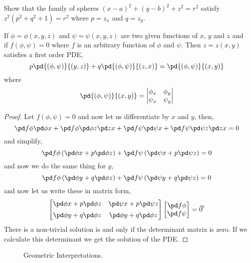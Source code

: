 \begin{exercise}
  Show that the family of spheres $(x - a)^2 + (y - b)^2 + z^2 = r^2$ satisfy $z^2(p^2 + q^2 + 1) = r^2$ where $p = z_x$ and $q = z_y$.
\end{exercise}

\begin{nthm}[]
  If $\phi = \phi(x, y, z)$ and $\psi = \psi(x, y, z)$ are two given functions of $x$, $y$ and $z$ and if $f(\phi, \psi) = 0$ where $f$ is an arbitrary function of $\phi$ and $\psi$. Then $z = z(x, y)$ satisfies a first order PDE,
  $$ p\pd{(\phi, \psi)}{(y, z)} + q\pd{(\phi, \psi)}{(z, x)} = \pd{(\phi, \psi)}{(x, y)} $$
  where
  $$ \pd{(\phi, \psi)}{(x, y)} = \left| \begin{matrix}
    \phi_x & \phi_y \\ \psi_x & \psi_y
  \end{matrix} \right| $$
\end{nthm}
\begin{proof}
  Let $f(\phi, \psi) = 0$ and now let us differentiate by $x$ and $y$, then,
  $$ \pd f \phi \pd \phi x + \pd f \phi\pd \phi z \pd z x + \pd f \psi \pd \psi x + \pd f \psi \pd \psi z \pd z x = 0 $$
  and simplify,
  $$ \pd f \phi \left( \pd \phi x + p\pd \phi z \right) + \pd f \psi \left(\pd \psi x + p\pd \psi z\right) = 0 $$
  and now we do the same thing for $y$,
  $$ \pd f \phi \left( \pd \phi y + q\pd \phi z \right) + \pd f \psi \left( \pd \psi y + q\pd \psi z\right) = 0 $$
  and now let us write these in matrix form,
  $$ \begin{bmatrix}
    \pd \phi x + p\pd \phi z & \pd \psi x + p\pd \psi z\\[5pt]
    \pd \phi y + q\pd \phi z & \pd \phi y + q\pd \phi z
  \end{bmatrix}\begin{bmatrix}
    \pd f \phi \\ \pd f \psi
  \end{bmatrix} = \vec 0'$$
  There is a non-trivial solution is and only if the  determinant matrix is zero. If we calculate this determinant we get the solution of the PDE.
\end{proof}

\begin{wrapfigure}{r}{0.5\textwidth}
  \centering
  \vspace{-10pt}
  \resizebox{0.5\textwidth}{!}{}
  \caption{Geometric Interpretations.}
\end{wrapfigure}

